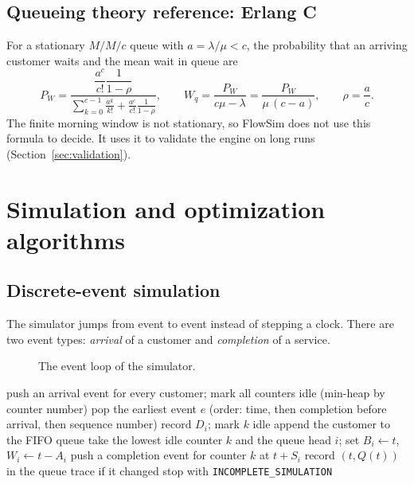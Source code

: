 \documentclass[11pt,a4paper]{article}
\newcommand{\code}[1]{\texttt{#1}}
\begin{document}
\subsection{Queueing theory reference: Erlang C}
For a stationary $M/M/c$ queue with $a=\lambda/\mu<c$, the probability that an arriving customer waits and the mean
wait in queue are
\begin{equation}
  P_W = \frac{\dfrac{a^c}{c!}\dfrac{1}{1-\rho}}{\displaystyle\sum_{k=0}^{c-1}\frac{a^k}{k!} + \frac{a^c}{c!}\frac{1}{1-\rho}},
  \qquad
  W_q = \frac{P_W}{c\mu-\lambda} = \frac{P_W}{\mu\,(c-a)},\qquad \rho=\frac ac.
  \label{eq:erlang}
\end{equation}
The finite morning window is not stationary, so FlowSim does not use this formula to decide. It uses it to validate the
engine on long runs (Section~\ref{sec:validation}).

\section{Simulation and optimization algorithms}
\subsection{Discrete-event simulation}\label{sec:des}
The simulator jumps from event to event instead of stepping a clock. There are two event types: \emph{arrival} of a
customer and \emph{completion} of a service.

\begin{figure}[H]\centering\eventdiagram\caption{The event loop of the simulator.}\end{figure}

\begin{algorithm}[H]
\caption{Simulate one run with $c$ counters}
\begin{algorithmic}[1]
\State push an arrival event for every customer; mark all counters idle (min-heap by counter number)
  \State pop the earliest event $e$ (order: time, then completion before arrival, then sequence number)
   \State record $D_i$; mark $k$ idle
  \Else \State append the customer to the FIFO queue
  \EndIf
    \State take the lowest idle counter $k$ and the queue head $i$; set $B_i\gets t$, $W_i\gets t-A_i$
    \State push a completion event for counter $k$ at $t+S_i$
  \EndWhile
  \State record $(t, Q(t))$ in the queue trace if it changed
   \State stop with \code{INCOMPLETE\_SIMULATION} \EndIf
\EndWhile
\end{algorithmic}
\end{algorithm}
\end{document}
